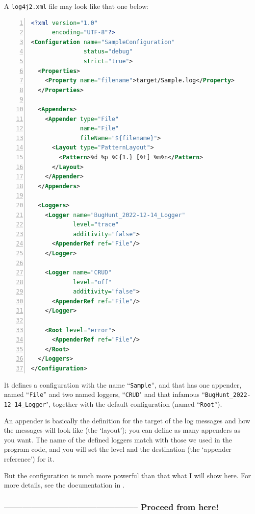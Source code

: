 \documentclass[11pt,a4paper, titlepage, parskip=half, headsepline, footsepline, cleardoublepage=current, headheight=1cm]{scrbook}
\begin{document}
A \verb#log4j2.xml# file may look like that one below:
\begin{lstlisting}[language=XML,numbers=left,caption={Sample Log4j Configuration}]
<?xml version="1.0"
      encoding="UTF-8"?>
<Configuration name="SampleConfiguration" 
               status="debug" 
               strict="true">
  <Properties>
    <Property name="filename">target/Sample.log</Property>
  </Properties>
 
  <Appenders>
    <Appender type="File" 
              name="File" 
              fileName="${filename}">
      <Layout type="PatternLayout">
        <Pattern>%d %p %C{1.} [%t] %m%n</Pattern>
      </Layout>
    </Appender>
  </Appenders>
 
  <Loggers>
    <Logger name="BugHunt_2022-12-14_Logger" 
            level="trace" 
            additivity="false">
      <AppenderRef ref="File"/>
    </Logger>
 
    <Logger name="CRUD" 
            level="off" 
            additivity="false">
      <AppenderRef ref="File"/>
    </Logger>
 
    <Root level="error">
      <AppenderRef ref="File"/>
    </Root>
  </Loggers>
</Configuration>
\end{lstlisting}

It defines a configuration with the name “\verb#Sample#”, and that has one appender, named “\verb#File#” and two named loggers, “\verb#CRUD#" and that infamous “\verb#BugHunt_2022-12-14_Logger#", together with the default configuration (named “\verb#Root#”).

An appender is basically the definition for the target of the log messages and how the messages will look like (the ‘layout’); you can define as many appenders as you want. The name of the defined loggers match with those we used in the program code, and you will set the level and the destination (the ‘appender reference’) for it.

But the configuration is much more powerful than that what I will show here. For more details, see the documentation in \autocite{APACHE_LOG4J:Configuration}.
\subsubsection{-------------------------------------------- Proceed from here!}

\begin{lstlisting}
\end{lstlisting}
\end{document}
